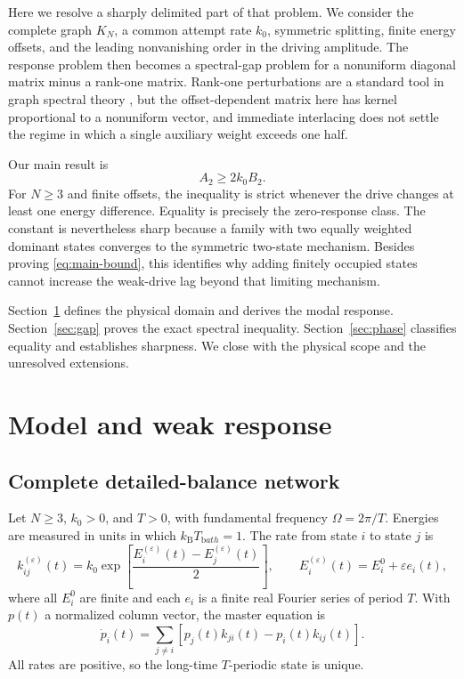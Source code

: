 \documentclass[11pt]{article}
\begin{document}
Here we resolve a sharply delimited part of that problem.  We consider the complete
graph $K_N$, a common attempt rate $k_0$, symmetric splitting, finite energy offsets,
and the leading nonvanishing order in the driving amplitude.  The response problem
then becomes a spectral-gap problem for a nonuniform diagonal matrix minus a rank-one
matrix.  Rank-one perturbations are a standard tool in graph spectral theory
\cite{KleeStamps2020}, but the offset-dependent matrix here has kernel proportional to
a nonuniform vector, and immediate interlacing does not settle the regime in which a
single auxiliary weight exceeds one half.

Our main result is
\begin{equation}
  A_2\geq 2k_0B_2 .                                           \label{eq:main-bound}
\end{equation}
For $N\geq3$ and finite offsets, the inequality is strict whenever the drive changes
at least one energy difference.  Equality is precisely the zero-response class.  The
constant is nevertheless sharp because a family with two equally weighted dominant
states converges to the symmetric two-state mechanism.  Besides proving
\eqref{eq:main-bound}, this identifies why adding finitely occupied states cannot
increase the weak-drive lag beyond that limiting mechanism.

Section~\ref{sec:model} defines the physical domain and derives the modal response.
Section~\ref{sec:gap} proves the exact spectral inequality.  Section~\ref{sec:phase}
classifies equality and establishes sharpness.  We close with the physical scope and
the unresolved extensions.

\section{Model and weak response}                         \label{sec:model}

\subsection{Complete detailed-balance network}

Let $N\geq3$, $k_0>0$, and $T>0$, with fundamental frequency
$\Omega=2\pi/T$.  Energies are measured in units in which
$k_{\mathrm B}T_{\mathrm bath}=1$.  The rate from state $i$ to state $j$ is
\begin{equation}
 k_{ij}^{(\varepsilon)}(t)
 =k_0\exp\!\left[\frac{E_i^{(\varepsilon)}(t)
                         -E_j^{(\varepsilon)}(t)}{2}\right],
 \qquad
 E_i^{(\varepsilon)}(t)=E_i^0+\varepsilon e_i(t),          \label{eq:rates}
\end{equation}
where all $E_i^0$ are finite and each $e_i$ is a finite real Fourier series of
period $T$.  With $p(t)$ a normalized column vector, the master equation is
\begin{equation}
 \dot p_i(t)=\sum_{j\ne i}
 \left[p_j(t)k_{ji}(t)-p_i(t)k_{ij}(t)\right].              \label{eq:master}
\end{equation}
All rates are positive, so the long-time $T$-periodic state is unique.
\end{document}
